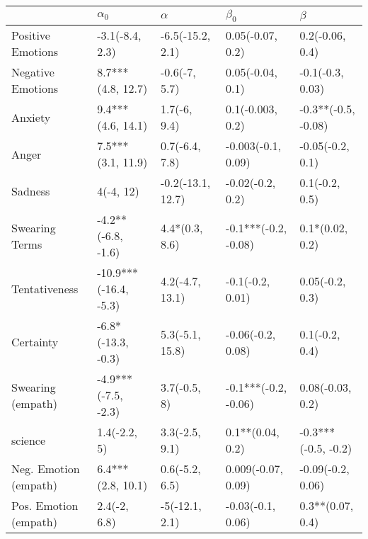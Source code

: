 \begin{tabular}{lllll}
\toprule
{} &             $\alpha_0$ &           $\alpha$ &             $\beta_0$ &              $\beta$ \\
\midrule
Positive Emotions     &        -3.1(-8.4, 2.3) &   -6.5(-15.2, 2.1) &      0.05(-0.07, 0.2) &      0.2(-0.06, 0.4) \\
Negative Emotions     &      8.7***(4.8, 12.7) &      -0.6(-7, 5.7) &      0.05(-0.04, 0.1) &     -0.1(-0.3, 0.03) \\
Anxiety               &      9.4***(4.6, 14.1) &       1.7(-6, 9.4) &      0.1(-0.003, 0.2) &  -0.3**(-0.5, -0.08) \\
Anger                 &      7.5***(3.1, 11.9) &     0.7(-6.4, 7.8) &    -0.003(-0.1, 0.09) &     -0.05(-0.2, 0.1) \\
Sadness               &              4(-4, 12) &  -0.2(-13.1, 12.7) &      -0.02(-0.2, 0.2) &       0.1(-0.2, 0.5) \\
Swearing Terms        &     -4.2**(-6.8, -1.6) &     4.4*(0.3, 8.6) &  -0.1***(-0.2, -0.08) &      0.1*(0.02, 0.2) \\
Tentativeness         &  -10.9***(-16.4, -5.3) &    4.2(-4.7, 13.1) &      -0.1(-0.2, 0.01) &      0.05(-0.2, 0.3) \\
Certainty             &     -6.8*(-13.3, -0.3) &    5.3(-5.1, 15.8) &     -0.06(-0.2, 0.08) &       0.1(-0.2, 0.4) \\
Swearing (empath)     &    -4.9***(-7.5, -2.3) &       3.7(-0.5, 8) &  -0.1***(-0.2, -0.06) &     0.08(-0.03, 0.2) \\
science               &           1.4(-2.2, 5) &     3.3(-2.5, 9.1) &      0.1**(0.04, 0.2) &  -0.3***(-0.5, -0.2) \\
Neg. Emotion (empath) &      6.4***(2.8, 10.1) &     0.6(-5.2, 6.5) &    0.009(-0.07, 0.09) &    -0.09(-0.2, 0.06) \\
Pos. Emotion (empath) &           2.4(-2, 6.8) &     -5(-12.1, 2.1) &     -0.03(-0.1, 0.06) &     0.3**(0.07, 0.4) \\
\bottomrule
\end{tabular}
